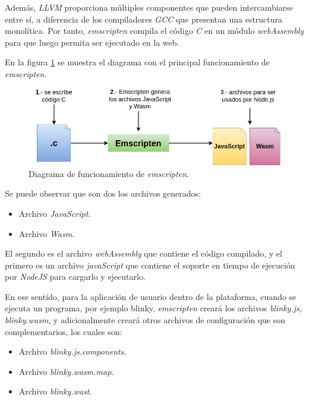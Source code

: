 Además, \textit{LLVM} proporciona múltiples componentes que pueden intercambiarse entre sí, a diferencia de los compiladores \textit{GCC} que presentan una estructura monolítica. Por tanto, \textit{emscripten} compila el código \textit{C} en un módulo \textit{webAssembly} para que luego permita ser ejecutado en la web.

En la figura \ref{fig:Emscripten} se muestra el diagrama con el principal funcionamiento de \textit{emscripten}. 
\hfill \break

\begin{figure}[ht]
	\centering
	\includegraphics[scale=.50]{./Figures/Emscripten.png}
	\caption{Diagrama de funcionamiento de \textit{emscripten}.}
	\label{fig:Emscripten}
\end{figure}



Se puede observar que son dos los archivos generados:
\begin{itemize}
	\item Archivo \textit{JavaScript}.
	\item Archivo \textit{Wasm}.
\end{itemize}
El segundo es el archivo \textit{webAssembly} que contiene el código compilado, y el primero es un archivo \textit{javaScript} que contiene el soporte en tiempo de ejecución por \textit{NodeJS} para cargarlo y ejecutarlo.


En ese sentido, para la aplicación de usuario dentro de la plataforma, cuando se ejecuta un programa, por ejemplo blinky, \textit{emscripten} creará los archivos \textit{blinky.js}, \textit{blinky.wasm}, y adicionalmente creará otros archivos de configuración que son complementarios, los cuales son:

\begin{itemize}
	\item Archivo \textit{blinky.js.components}.
	\item Archivo \textit{blinky.wasm.map}.
	\item Archivo \textit{blinky.wast}.
\end{itemize}



